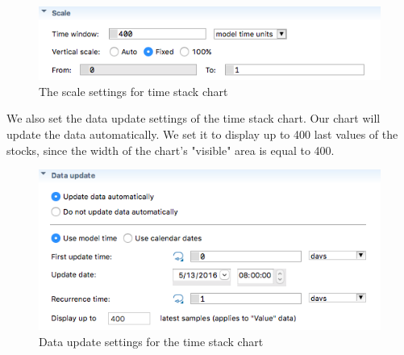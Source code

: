 \begin{figure}[H]
  \centering
  \includegraphics[height=0.2\textwidth]{img/screens/charts/charts3}
  \caption{The scale settings for time stack chart}
\end{figure}

We also set the data update settings of the time stack chart. Our chart will update the data automatically. We set it to display up to 400 last values of the stocks, since the width of the chart's "visible" area is equal to 400.

\begin{figure}[H]
  \centering
  \includegraphics[height=0.3\textwidth]{img/screens/charts/charts4}
  \caption{Data update settings for the time stack chart}
\end{figure}
